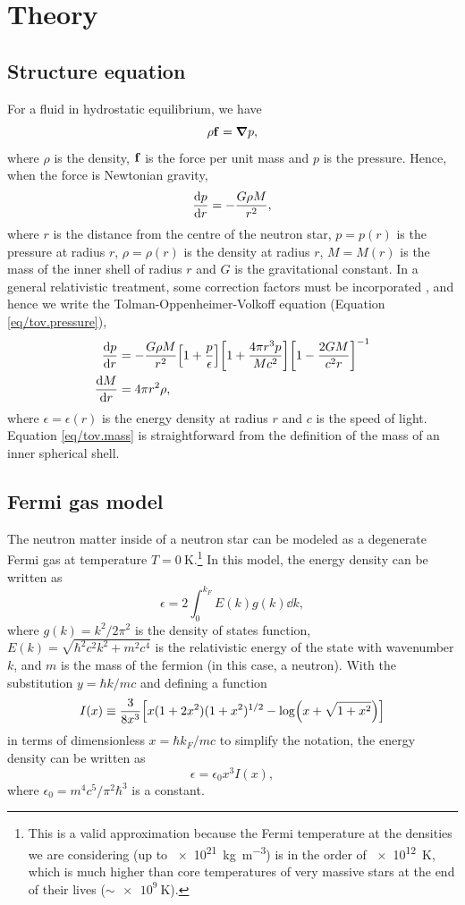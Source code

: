 \documentclass[draft,11pt]{article}
\theoremstyle{definition}
\theoremstyle{remark}
\renewcommand{\vec}[1]{\vb{#1}}
\begin{document}
    \section{Theory}
        \subsection{Structure equation}
            For a fluid in hydrostatic equilibrium, we have \[\rho\vec{f}=\grad{p},\] where $\rho$ is the density, $\vec{f}$ is the force per unit mass and $p$ is the pressure. Hence, when the force is Newtonian gravity, \[\dv{p}{r}=-\frac{G\rho M}{r^{2}},\] where $r$ is the distance from the centre of the neutron star, $p=p(r)$ is the pressure at radius $r$, $\rho=\rho(r)$ is the density at radius $r$, $M=M(r)$ is the mass of the inner shell of radius $r$ and $G$ is the gravitational constant. In a general relativistic treatment, some correction factors must be incorporated \parencite{silbar.reddy.2004/neutron.stars}, and hence we write the Tolman-Oppenheimer-Volkoff equation (Equation \ref{eq/tov.pressure}),
            \begin{align}
                \label{eq/tov.pressure}\dv{p}{r}&=-\frac{G\rho M}{r^{2}}\qty[1+\frac{p}{\epsilon}]\qty[1+\frac{4\pi r^{3}p}{Mc^{2}}]\qty[1-\frac{2GM}{c^{2}r}]^{-1}\\
                \label{eq/tov.mass}\dv{M}{r}&=4\pi r^{2}\rho,
            \end{align}
            where $\epsilon=\epsilon(r)$ is the energy density at radius $r$ and $c$ is the speed of light. Equation \ref{eq/tov.mass} is straightforward from the definition of the mass of an inner spherical shell.

            
        \subsection{Fermi gas model} %
            The neutron matter inside of a neutron star can be modeled as a degenerate Fermi gas at temperature $T=\SI{0}{\kelvin}$.\footnote{This is a valid approximation because the Fermi temperature at the densities we are considering (up to \SI{e21}{\kilogram\per\meter\cubed}) is in the order of \SI{e12}{\kelvin}, which is much higher than core temperatures of very massive stars at the end of their lives ($\sim\SI{e9}{\kelvin}$).} In this model, the energy density can be written as \parencite{koonin.1986/computational.physics/rk4.white.dwarf}
            \[\epsilon=2\int_{0}^{k_{F}}E(k)g(k)\dd{k},\] where $g(k)=k^{2}/2\pi^{2}$ is the density of states function, $E(k)=\sqrt{\hbar^{2}c^{2}k^{2}+m^{2}c^{4}}$ is the relativistic energy of the state with wavenumber $k$, and $m$ is the mass of the fermion (in this case, a neutron). With the substitution $y=\hbar k/mc$ and defining a function \parencite{koonin.1986/computational.physics/rk4.white.dwarf} \[I(x)\equiv \frac{3}{8x^{3}}\qty[x(1+2x^{2})(1+x^{2})^{1/2}-\log(x+\sqrt{1+x^{2}})]\] in terms of dimensionless $x=\hbar k_{F}/mc$ to simplify the notation, the energy density can be written as \[\epsilon=\epsilon_{0}x^{3}I(x),\] where $\epsilon_{0}=m^{4}c^{5}/\pi^{2}\hbar^{3}$ is a constant.
            
\end{document}
